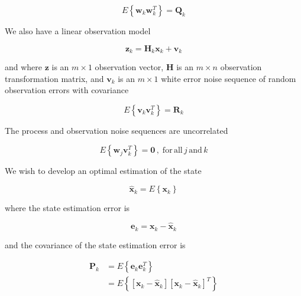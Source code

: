 \documentclass[12pt]{article}
\begin{document}
\begin{equation}
    E \left\{ \mathbf{w}_k \mathbf{w}_k^T \right\} = \mathbf{Q}_k
    \label{eq:process-noise-covariance}
\end{equation}

We also have a linear observation model

\begin{equation}
    \mathbf{z}_k = \mathbf{H}_k \mathbf{x}_k + \mathbf{v}_k
    \label{eq:linear-system-observation-model}
\end{equation}

and where $\mathbf{z}$ is an $m \times 1$ observation vector,
$\mathbf{H}$ is an $m \times n$ observation transformation matrix,
and $\mathbf{v}_k$ is an $m \times 1$ white error noise sequence of random observation errors with covariance

\begin{equation}
    E \left\{ \mathbf{v}_k \mathbf{v}_k^T \right\} = \mathbf{R}_k
    \label{eq:observation-noise-covariance}
\end{equation}

The process and observation noise sequences are uncorrelated

\begin{equation*}
    E \left\{ \mathbf{w}_j \mathbf{v}_k^T \right\} = \mathbf{0} \, , \phantom{.} \mathrm{for} \, \mathrm{all} \, j \, \mathrm{and} \, k
\end{equation*}

We wish to develop an optimal estimation of the state

\begin{equation*}
    \hat{\mathbf{x}}_k = E \left\{ \mathbf{x}_k \right\}
\end{equation*}

where the state estimation error is

\begin{equation*}
    \mathbf{e}_k = \mathbf{x}_{k} - \hat{\mathbf{x}}_k
\end{equation*}

and the covariance of the state estimation error is

\begin{equation*}
    \begin{aligned}
        \mathbf{P}_k &= E \left\{ \mathbf{e}_k \mathbf{e}_k^T \right\} \\
        &= E \left\{ \left[ \mathbf{x}_{k} - \hat{\mathbf{x}}_k \right] \left[ \mathbf{x}_{k} - \hat{\mathbf{x}}_k \right]^T \right\}
    \end{aligned}
\end{equation*}
\end{document}
